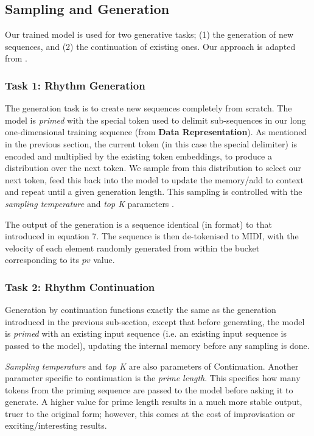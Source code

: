 \documentclass[sigconf]{nimeart}
\begin{document}
\subsection{Sampling and Generation}\label{sampling-and-generation}

Our trained model is used for two generative tasks; (1) the generation of new sequences, and (2) the continuation of existing ones. Our approach is adapted from \cite{c8}.

\subsubsection{Task 1: Rhythm Generation}\label{task-1-rhythm-generation}

The generation task is to create new sequences completely from scratch. The model is \emph{primed} with the special token used to delimit sub-sequences in our long one-dimensional training sequence (from \textbf{Data Representation}). As mentioned in the previous section, the current token (in this case the special delimiter) is encoded and multiplied by the existing token embeddings, to produce a distribution over the next token. We sample from this distribution to select our next token, feed this back into the model to update the memory/add to context and repeat until a given generation length. This sampling is controlled with the \emph{sampling temperature} and \emph{top K} parameters \cite{c30}.

The output of the generation is a sequence identical (in format) to that introduced in equation 7. The sequence is then de-tokenised to MIDI, with the velocity of each element randomly generated from within the bucket corresponding to its $pv$ value.

\subsubsection{Task 2: Rhythm Continuation}\label{task-2-rhythm-continuation}

Generation by continuation functions exactly the same as the generation introduced in the previous sub-section, except that before generating, the model is \emph{primed} with an existing input sequence (i.e. an existing input sequence is passed to the model), updating the internal memory before any sampling is done.

\emph{Sampling temperature} and \emph{top K} are also parameters of Continuation. Another parameter specific to continuation is the \emph{prime length}. This specifies how many tokens from the priming sequence are passed to the model before asking it to generate. A higher value for prime length results in a much more stable output, truer to the original form; however, this comes at the cost of improvisation or exciting/interesting results.
\end{document}
